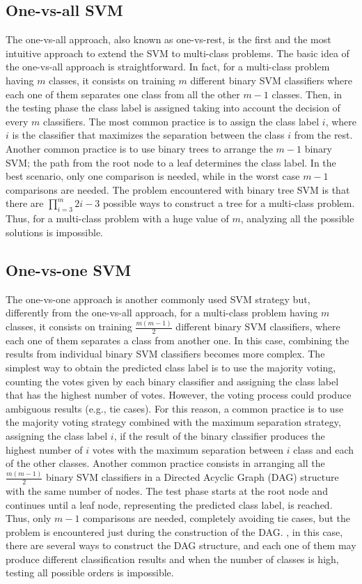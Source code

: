 \documentclass[final,a4paper,12pt,english]{UnicaPhdThesis3}
\begin{document}
\subsection{One-vs-all SVM} 
The one-vs-all approach, also known as one-vs-rest, is the first and the most intuitive approach to extend the SVM to multi-class problems. The basic idea of the one-vs-all approach is straightforward. In fact, for a multi-class problem having $m$ classes, it consists on training $m$ different binary SVM classifiers where each one of them separates one class from all the other $m-1$ classes. Then, in the testing phase the class label is assigned taking into account the decision of every $m$ classifiers. The most common practice is to assign the class label $i$, where $i$ is the classifier that maximizes the separation between the class $i$ from the rest. Another common practice is to use binary trees to arrange the $m-1$ binary SVM; the path from the root node to a leaf determines the class label. In the best scenario, only one comparison is needed, while in the worst case  $m-1$ comparisons are needed. The problem encountered with binary tree SVM is that there are $\prod_{i=3}^{m}2i-3$ possible ways to construct a tree for a multi-class problem. Thus, for a multi-class problem with a huge value of $m$, analyzing all the possible solutions is impossible.

\subsection{One-vs-one SVM}
The one-vs-one approach is another commonly used SVM strategy but, differently from the one-vs-all approach, for a multi-class problem having $m$ classes, it consists on training $\frac{m(m-1)}{2}$ different binary SVM classifiers, where each one of them separates a class from another one. In this case, combining the results from individual binary SVM classifiers becomes more complex. The simplest way to obtain the predicted class label is to use the majority voting, counting the votes given by each binary classifier and assigning the class label that has the highest number of votes. However, the voting process could produce ambiguous results (e.g., tie cases).
For this reason, a common practice is to use the majority voting strategy combined with the maximum separation strategy, assigning the class label $i$, if the result of the binary classifier produces the highest number of $i$ votes with the maximum separation between $i$ class and each of the other classes. Another common practice consists in arranging all the $\frac{m(m-1)}{2}$ binary SVM classifiers in a Directed Acyclic Graph (\acs{DAG}) structure with the same number of nodes. The test phase starts at the root node and continues until a leaf node, representing the predicted class label, is reached. Thus, only $m-1$ comparisons are needed, completely avoiding tie cases, but the problem is encountered just during the construction of the DAG. , in this case, there are several ways to construct the DAG structure, and each one of them may produce different classification results and when the number of classes is high, testing all possible orders is impossible.
\end{document}
